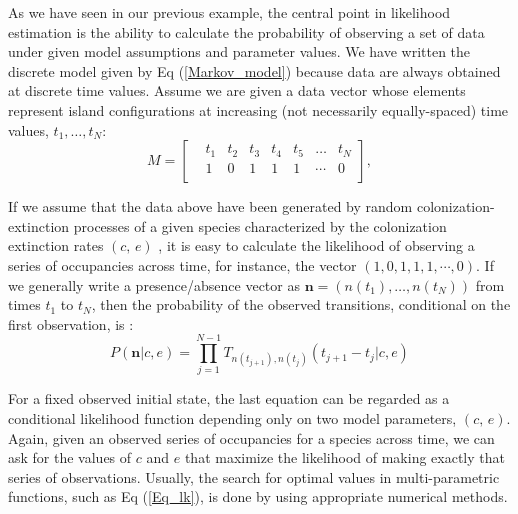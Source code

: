 As we have seen in our previous example, the central point in likelihood estimation is the ability to calculate the probability of observing a set of data under given model assumptions and parameter values. We have written the discrete model given by Eq (\ref{Markov_model}) because data are always obtained at discrete time values. Assume we are given a data vector whose elements represent island configurations at increasing (not necessarily equally-spaced) time values, $t_1, \dots, t_N$:
\begin{equation}
	\label{eq:data}
	M = 
	\left[
	\begin{array}{rccccccc}
	& t_1 & t_2 & t_3 & t_4  & t_5 & \dots & t_N                             \\
	& 1 & 0 & 1 & 1 & 1 & \cdots & 0                                   \\
	\end{array}
	\right],
\end{equation}
\smallskip

If we assume that the data above have been generated by random colonization-extinction processes of a given species characterized by the colonization extinction rates $(c,\, e)$ , it is easy to calculate the likelihood of observing a series of occupancies across time, for instance, the vector $(1, 0, 1, 1, 1, \cdots, 0)$. If we generally write a presence/absence vector as ${\boldsymbol n}=(n(t_1),\dots,n(t_N))$ from times $t_{1}$ to $t_N$, then the probability of the observed transitions, conditional on the first observation, is \citep{Alonso2015}:
\begin{equation}
P( {\boldsymbol n} | c, e) = \prod_{j=1}^{N-1}T_{n(t_{j+1}),n(t_j)}(t_{j+1}-t_{j}| c,e) 
\label{Eq_lk}
\end{equation}

For a fixed observed initial state, the last equation can be regarded as a conditional likelihood function depending only on two model parameters, $(c,\,e)$. Again, given an observed series of occupancies for a species across time, we can ask for the values of $c$ and $e$ that maximize the likelihood of making exactly that series of observations. Usually, the search for optimal values in multi-parametric functions, such as Eq (\ref{Eq_lk}), is done by using appropriate numerical methods.
\smallskip

